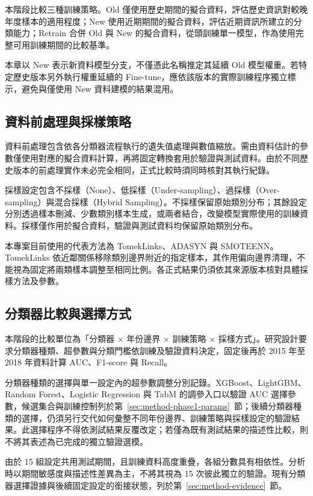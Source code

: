 本階段比較三種訓練策略。Old 僅使用歷史期間的擬合資料，評估歷史資訊對較晚年度樣本的適用程度；New 使用近期期間的擬合資料，評估近期資訊所建立的分類能力；Retrain 合併 Old 與 New 的擬合資料，從頭訓練單一模型，作為使用完整可用訓練期間的比較基準。

本章以 New 表示新資料模型分支，不僅憑此名稱推定其延續 Old 模型權重。若特定歷史版本另外執行權重延續的 Fine-tune，應依該版本的實際訓練程序獨立標示，避免與僅使用 New 資料建模的結果混用。

\subsection{資料前處理與採樣策略}

資料前處理包含依各分類器流程執行的遺失值處理與數值縮放。需由資料估計的參數僅使用對應的擬合資料計算，再將固定轉換套用於驗證與測試資料。由於不同歷史版本的前處理實作未必完全相同，正式比較時須同時核對其執行紀錄。

採樣設定包含不採樣（None）、低採樣（Under-sampling）、過採樣（Over-sampling）與混合採樣（Hybrid Sampling）。不採樣保留原始類別分布；其餘設定分別透過樣本刪減、少數類別樣本生成，或兩者結合，改變模型實際使用的訓練資料。採樣僅作用於擬合資料，驗證與測試資料均保留原始類別分布。

本專案目前使用的代表方法為 TomekLinks、ADASYN 與 SMOTEENN。TomekLinks 依近鄰關係移除類別邊界附近的指定樣本，其作用偏向邊界清理，不能視為固定將兩類樣本調整至相同比例。各正式結果仍須依其來源版本核對具體採樣方法及參數。

\subsection{分類器比較與選擇方式}

本階段的比較單位為「分類器 \ensuremath{\times} 年份邊界 \ensuremath{\times} 訓練策略 \ensuremath{\times} 採樣方式」。研究設計要求分類器種類、超參數與分類門檻依訓練及驗證資料決定，固定後再於 2015 年至 2018 年資料計算 AUC、F1-score 與 Recall。

分類器種類的選擇與單一設定內的超參數調整分別記錄。XGBoost、LightGBM、Random Forest、Logistic Regression 與 TabM 的調參入口以驗證 AUC 選擇參數，候選集合與訓練控制列於第~\ref{sec:method-phase1-params}~節；後續分類器種類的選擇，仍須另行交代如何彙整不同年份邊界、訓練策略與採樣設定的驗證結果。此選擇程序不得依測試結果反覆改定；若僅為既有測試結果的描述性比較，則不將其表述為已完成的獨立驗證選模。

由於 15 組設定共用測試期間，且訓練資料高度重疊，各組分數具有相依性。分析時以期間敏感度與描述性差異為主，不將其視為 15 次彼此獨立的驗證。現有分類器選擇證據與後續固定設定的銜接狀態，列於第~\ref{sec:method-evidence}~節。

